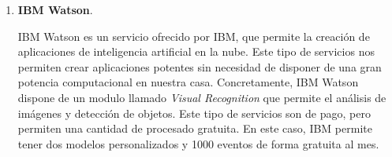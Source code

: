 \begin{enumerate}
	\item \textbf{IBM Watson}.
	
	IBM Watson es un servicio ofrecido por IBM, que permite la creación de aplicaciones de inteligencia artificial en la nube. Este tipo de servicios nos permiten crear aplicaciones potentes sin necesidad de disponer de una gran potencia computacional en nuestra casa. Concretamente, IBM Watson dispone de un modulo llamado \textit{Visual Recognition} que permite el análisis de imágenes y detección de objetos. Este tipo de servicios son de pago, pero permiten una cantidad de procesado gratuita. En este caso, IBM permite tener dos modelos personalizados y 1000 eventos de forma gratuita al mes. \cite{ibm}
\end{enumerate}



